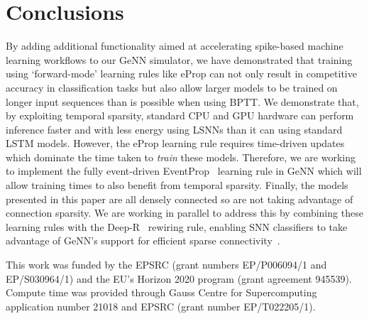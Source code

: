 \documentclass[sigconf]{acmart}
\begin{document}
\section{Conclusions}
By adding additional functionality aimed at accelerating spike-based machine learning workflows to our GeNN simulator, we have demonstrated that training using `forward-mode' learning rules like eProp can not only result in competitive accuracy in classification tasks but also allow  larger models to be trained on longer input sequences than is possible when using BPTT.
We demonstrate that, by exploiting temporal sparsity, standard CPU and GPU hardware can perform inference faster and with less energy using LSNNs than it can using standard LSTM models.
However, the eProp learning rule requires time-driven updates which dominate the time taken to \emph{train} these models.
Therefore, we are working to implement the fully event-driven EventProp~\citep{Wunderlich2021} learning rule in GeNN which will allow training times to also benefit from temporal sparsity.
Finally, the models presented in this paper are all densely connected so are not taking advantage of connection sparsity.
We are working in parallel to address this by combining these learning rules with the Deep-R~\citep{Bellec2018a} rewiring rule, enabling SNN classifiers to take advantage of GeNN's support for efficient sparse connectivity~\citep{Knight2018}.


\begin{acks}
This work was funded by the EPSRC (grant numbers EP/P006094/1 and EP/S030964/1) and the EU's Horizon 2020 program (grant agreement 945539).
Compute time was provided through Gauss Centre for Supercomputing application number 21018 and EPSRC (grant number EP/T022205/1).
\end{acks}

\balance


\end{document}

